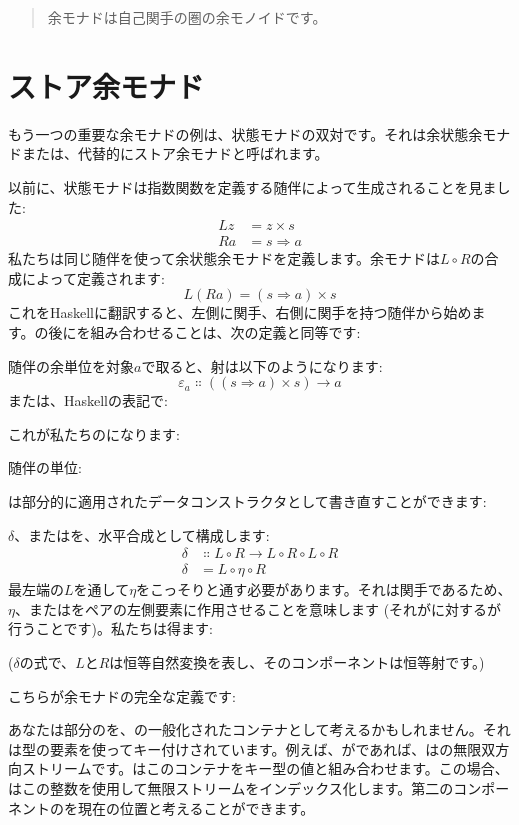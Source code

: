 \begin{quote}
  余モナドは自己関手の圏の余モノイドです。
\end{quote}

\section{ストア余モナド}

もう一つの重要な余モナドの例は、状態モナドの双対です。それは余状態余モナドまたは、代替的にストア余モナドと呼ばれます。

以前に、状態モナドは指数関数を定義する随伴によって生成されることを見ました: 
\begin{align*}
  L z & = z\times{}s      \\
  R a & = s \Rightarrow a
\end{align*}
私たちは同じ随伴を使って余状態余モナドを定義します。余モナドは$L \circ R$の合成によって定義されます: 
\[L (R a) = (s \Rightarrow a)\times{}s\]
これをHaskellに翻訳すると、左側に関手、右側に関手を持つ随伴から始めます。の後にを組み合わせることは、次の定義と同等です: 

随伴の余単位を対象$a$で取ると、射は以下のようになります: 
\[\varepsilon_a \Colon ((s \Rightarrow a)\times{}s) \to a\]
または、Haskellの表記で: 

これが私たちのになります: 

随伴の単位: 

は部分的に適用されたデータコンストラクタとして書き直すことができます: 

$\delta$、またはを、水平合成として構成します: 
\begin{align*}
  \delta & \Colon L \circ R \to L \circ R \circ L \circ R \\
  \delta & = L \circ \eta \circ R
\end{align*}
最左端の$L$を通して$\eta$をこっそりと通す必要があります。それは関手であるため、$\eta$、またはをペアの左側要素に作用させることを意味します (それがに対するが行うことです)。私たちは得ます: 

 ($\delta$の式で、$L$と$R$は恒等自然変換を表し、そのコンポーネントは恒等射です。) 

こちらが余モナドの完全な定義です: 

あなたは部分のを、の一般化されたコンテナとして考えるかもしれません。それは型の要素を使ってキー付けされています。例えば、がであれば、はの無限双方向ストリームです。はこのコンテナをキー型の値と組み合わせます。この場合、はこの整数を使用して無限ストリームをインデックス化します。第二のコンポーネントのを現在の位置と考えることができます。

